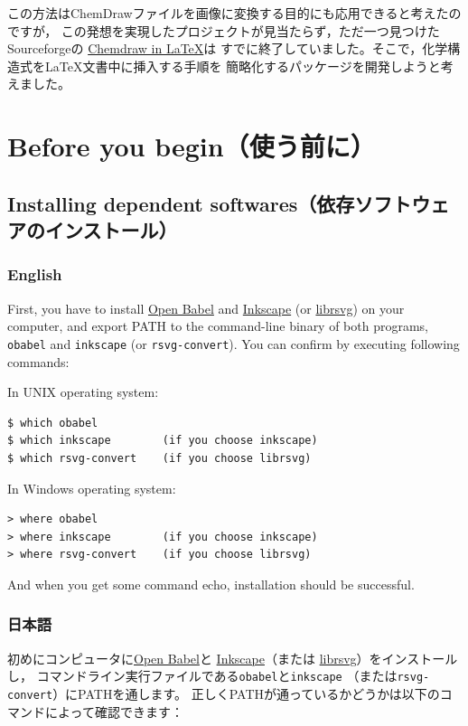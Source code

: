 \documentclass[12pt]{ltjsarticle}
\begin{document}
この方法はChemDrawファイルを画像に変換する目的にも応用できると考えたのですが，
この発想を実現したプロジェクトが見当たらず，ただ一つ見つけたSourceforgeの
\href{http://chemdrawinlatex.sourceforge.net/}{Chemdraw in \LaTeX}は
すでに終了していました。そこで，化学構造式を\LaTeX 文書中に挿入する手順を
簡略化するパッケージを開発しようと考えました。

\clearpage

\section{Before you begin（使う前に）}

\subsection{Installing dependent softwares（依存ソフトウェアのインストール）}

\subsubsection{English}

First, you have to install \href{http://openbabel.org/}{Open Babel} and
\href{https://inkscape.org/en/}{Inkscape}
(or \href{http://librsvg.sourceforge.net/download/}{librsvg}) on your
computer, and export PATH to the command-line binary of both programs,
\verb+obabel+ and \verb+inkscape+ (or \verb+rsvg-convert+).
You can confirm by executing following commands:

In UNIX operating system:
\begin{verbatim}
$ which obabel
$ which inkscape        (if you choose inkscape)
$ which rsvg-convert    (if you choose librsvg)
\end{verbatim}

In Windows operating system:
\begin{verbatim}
> where obabel
> where inkscape        (if you choose inkscape)
> where rsvg-convert    (if you choose librsvg)
\end{verbatim}

And when you get some command echo, installation should be successful.

\subsubsection{日本語}

初めにコンピュータに\href{http://openbabel.org/}{Open Babel}と
\href{https://inkscape.org/ja/}{Inkscape}（または
\href{http://librsvg.sourceforge.net/download/}{librsvg}）をインストールし，
コマンドライン実行ファイルである\verb+obabel+と\verb+inkscape+
（または\verb+rsvg-convert+）にPATHを通します。
正しくPATHが通っているかどうかは以下のコマンドによって確認できます：
\end{document}
